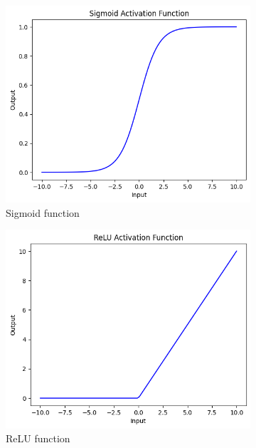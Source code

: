 \begin{figure}[h]
	\centering
	\begin{subfigure}{.33\textwidth}
		\centering
		\includegraphics[width=0.9\linewidth]{ImageFiles/NeuralNetworks/sigmoid}
		\caption{Sigmoid function}
		\label{fig:sigmoid}
	\end{subfigure}%
	\begin{subfigure}{.33\textwidth}
		\centering
		\includegraphics[width=0.9\linewidth]{ImageFiles/NeuralNetworks/relu}
		\caption{ReLU function}
		\label{fig:relu}
	\end{subfigure}%
	\begin{subfigure}{.33\textwidth}
		\centering

\end{subfigure}
\end{figure}
